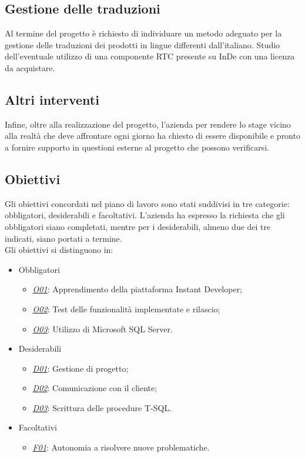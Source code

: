 \subsection{Gestione delle traduzioni}
Al termine del progetto è richiesto di individuare un metodo adeguato per la gestione delle traduzioni dei prodotti in lingue differenti dall'italiano. Studio dell'eventuale utilizzo di una componente RTC presente su InDe con una licenza da acquistare.

\subsection{Altri interventi}
Infine, oltre alla realizzazione del progetto, l'azienda per rendere lo stage vicino alla realtà che deve affrontare ogni giorno ha chiesto di essere disponibile e pronto a fornire supporto in questioni esterne al progetto che possono verificarsi.


\subsection{Obiettivi}
Gli obiettivi concordati nel piano di lavoro sono stati suddivisi in tre categorie: obbligatori, desiderabili e facoltativi. L'azienda ha espresso la richiesta che gli obbligatori siano completati, mentre per i desiderabili, almeno due dei tre indicati, siano portati a termine. \\
 
Gli obiettivi si distinguono in:
\begin{itemize}
	\item Obbligatori
	\begin{itemize}
		\item \underline{\textit{O01}}: Apprendimento della piattaforma Instant Developer;
		\item \underline{\textit{O02}}: Test delle funzionalità implementate e rilascio;
		\item \underline{\textit{O03}}: Utilizzo di Microsoft SQL Server.
	\end{itemize}
	
	\item Desiderabili 
	\begin{itemize}
		\item \underline{\textit{D01}}: Gestione di progetto;
		\item \underline{\textit{D02}}: Comunicazione con il cliente;
		\item \underline{\textit{D03}}: Scrittura delle procedure T-SQL.
	\end{itemize}
	
	\item Facoltativi
	\begin{itemize}
		\item \underline{\textit{F01}}: Autonomia a risolvere nuove problematiche.
	\end{itemize} 
\end{itemize}


